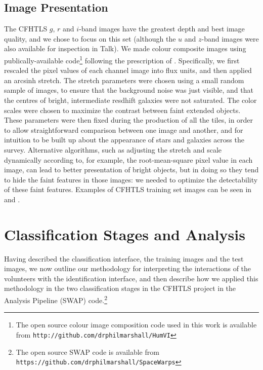 \documentclass[useAMS,usenatbib,a4paper]{mn2e}
\begin{document}

\subsection{Image Presentation}
\label{sec:data:display}

The CFHTLS $g$, $r$ and $i$-band images have the greatest depth and best image
quality, and we chose to focus on this set (although the $u$ and $z$-band
images were also available for inspection in Talk). We made colour composite
images using publically-available code\footnote{The open source  colour image
composition code used in this work is available from
\texttt{http://github.com/drphilmarshall/HumVI}} following the prescription of
\citet{LuptonEtal}. Specifically, we first rescaled the pixel values of each
channel image into flux units, and then applied an arcsinh stretch. The
stretch parameters were chosen using a small random sample of images, to
ensure that the background noise was just visible,  and that the centres of
bright, intermediate resdhift galaxies were not saturated. The color scales
were chosen to maximize the contrast between faint extended objects. These
parameters were then fixed during the production of all the tiles, in order to
allow straightforward comparison between one image and another, and for
intuition to be built up about the appearance of stars and galaxies across the
survey. Alternative algorithms, such as adjusting the stretch and scale
dynamically according to, for example, the root-mean-square pixel value in
each image, can lead to better presentation of bright objects, but in doing so
they tend to hide the faint features in those images: we needed to optimize
the detectability of these faint features.   Examples of CFHTLS training set
images can be seen in  and
.



\section{Classification Stages and Analysis}
\label{sec:swap}

Having described the classification interface, the training images and the
test images,  we now outline our methodology for interpreting the interactions
of the volunteers with the identification interface, and then describe how we
applied this methodology in the two classification stages in the CFHTLS
project in the \sw Analysis Pipeline (SWAP) code.\footnote{The open source 
SWAP code is available from 
\texttt{https://github.com/drphilmarshall/SpaceWarps}}
\end{document}
